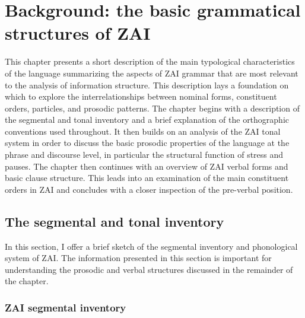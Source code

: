 \chapter{Background: the basic grammatical structures of ZAI}\label{backgroundchapter}


This chapter presents a short description of the main typological characteristics of the language summarizing the aspects of ZAI grammar that are most relevant to the analysis of information structure. This description lays a foundation on which to explore the interrelationships between nominal forms, constituent orders, particles, and prosodic patterns. The chapter begins with a description of the segmental and tonal inventory and a brief explanation of the orthographic conventions used throughout. It then builds on an analysis of the ZAI tonal system in order to discuss the basic prosodic properties of the language at the phrase and discourse level, in particular the structural function of stress and pauses. The chapter then continues with an overview of ZAI verbal forms and basic clause structure. This leads into an examination of the main constituent orders in ZAI and concludes with a closer inspection of the pre-verbal position. 



\section{The segmental and tonal inventory}\label{briefsketch}


In this section, I offer a brief sketch of the segmental inventory and phonological system of ZAI. The information presented in this section is important for understanding the prosodic and verbal structures discussed in the remainder of the chapter.

 
\subsection{ZAI segmental inventory}

